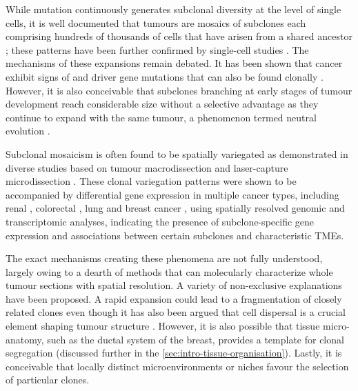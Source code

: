 While mutation continuously generates subclonal diversity at the level of single cells, it is well documented that tumours are mosaics of subclones each comprising hundreds of thousands of cells that have arisen from a shared ancestor \parencite{Shah2009-xz,Nik-Zainal2012-zz,McGranahan2015-gb,Andor2016-hi, Dentro2021-yb} ; these patterns have been further confirmed by single-cell studies \parencite{Navin2011-qq,Wang2014-bp,Casasent2018-gx,McPherson2016-zu,Laks2019-rp,Salehi2021-ad}. The mechanisms of these expansions remain debated. It has been shown that cancer  exhibit signs of  and driver gene mutations that can also be found clonally \parencite{Dentro2021-yb}. However, it is also conceivable that subclones branching at early stages of tumour development reach considerable size without a selective advantage as they continue to expand with the same tumour, a phenomenon termed neutral evolution \parencite{Williams2016-qh}.

Subclonal mosaicism is often found to be spatially variegated as demonstrated in diverse studies based on tumour macrodissection \parencite{Navin2010-uw,Gerlinger2012-qm,De_Bruin2014-ow,Gerlinger2014-hr, Yates2015-xk,Morrissy2017-vy,Jamal-Hanjani2017-uv,Watkins2020-gc} and laser-capture microdissection \parencite{Casasent2018-gx, Heide2022-ev,Woodcock2020-nt,Grossmann2021-sl,Zhao2022-xd,Heide2019-rr,Su2018-rr,Bao2018-kj} . These clonal variegation patterns were shown to be accompanied by differential gene expression in multiple cancer types, including renal \parencite{Gerlinger2012-qm}, colorectal  \parencite{Househam2022-cp}, lung \parencite{Biswas2019-kb} and breast cancer \parencite{Lomakin2022-ks}, using spatially resolved genomic and transcriptomic analyses, indicating the presence of subclone-specific gene expression and associations between certain subclones and characteristic \ac{TME}s.

The exact mechanisms creating these phenomena are not fully understood, largely owing to a dearth of methods that can molecularly characterize whole tumour sections with spatial resolution. A variety of non-exclusive explanations have been proposed. A rapid expansion could lead to a fragmentation of closely related clones \parencite{Sottoriva2015-ci} even though it has also been argued that cell dispersal is a crucial element shaping tumour structure \parencite{Waclaw2015-yw,Gallaher2019-xx}. However, it is also possible that tissue micro-anatomy, such as the ductal system of the breast, provides a template for clonal segregation (discussed further in the \cref{sec:intro-tissue-organisation}). Lastly, it is conceivable that locally distinct microenvironments or niches favour the selection of particular clones.

